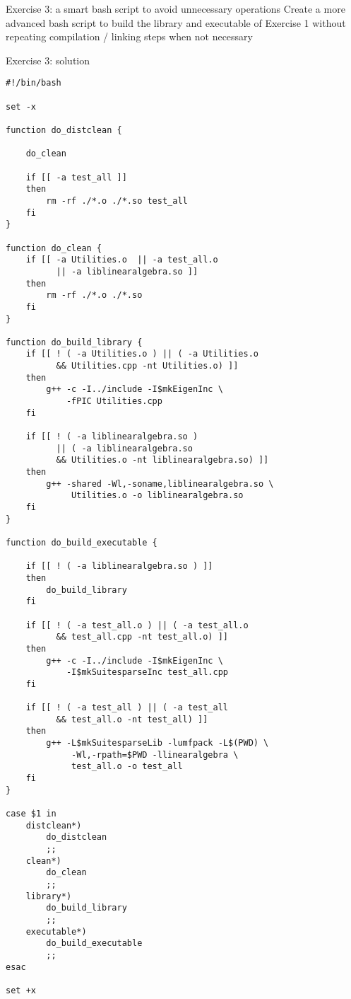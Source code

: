 \documentclass[10pt]{beamer}
\begin{document}
\begin{frame}{Exercise 3: a smart bash script to avoid unnecessary operations}
Create a more advanced bash script to build the library and executable of Exercise 1 without repeating compilation / linking steps when not necessary
\end{frame}

\begin{frame}{Exercise 3: solution}
\begin{verbatim}
#!/bin/bash

set -x

function do_distclean {

    do_clean

    if [[ -a test_all ]]
    then
        rm -rf ./*.o ./*.so test_all
    fi
}

function do_clean {
    if [[ -a Utilities.o  || -a test_all.o
          || -a liblinearalgebra.so ]]
    then
        rm -rf ./*.o ./*.so 
    fi
}

function do_build_library {
    if [[ ! ( -a Utilities.o ) || ( -a Utilities.o 
          && Utilities.cpp -nt Utilities.o) ]]
    then
        g++ -c -I../include -I$mkEigenInc \
            -fPIC Utilities.cpp
    fi

    if [[ ! ( -a liblinearalgebra.so )
          || ( -a liblinearalgebra.so
          && Utilities.o -nt liblinearalgebra.so) ]]
    then
        g++ -shared -Wl,-soname,liblinearalgebra.so \
             Utilities.o -o liblinearalgebra.so
    fi
}

function do_build_executable {

    if [[ ! ( -a liblinearalgebra.so ) ]]
    then
        do_build_library
    fi
       
    if [[ ! ( -a test_all.o ) || ( -a test_all.o
          && test_all.cpp -nt test_all.o) ]]
    then
        g++ -c -I../include -I$mkEigenInc \
            -I$mkSuitesparseInc test_all.cpp
    fi

    if [[ ! ( -a test_all ) || ( -a test_all
          && test_all.o -nt test_all) ]]
    then
        g++ -L$mkSuitesparseLib -lumfpack -L$(PWD) \
             -Wl,-rpath=$PWD -llinearalgebra \
             test_all.o -o test_all
    fi
}

case $1 in
    distclean*)        
        do_distclean
        ;;
    clean*)        
        do_clean
        ;;
    library*)
        do_build_library
        ;;
    executable*)
        do_build_executable
        ;;
esac

set +x
\end{verbatim}
\end{frame}
\end{document}
